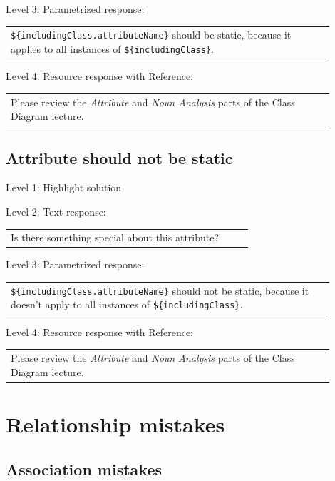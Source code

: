 \noindent Level 3: Parametrized response: \medskip

\begin{tabular}{|p{0.9\linewidth}}
\verb|${includingClass.attributeName}| should be static, because it applies to all instances of \verb|${includingClass}|.
\end{tabular} \medskip

\noindent Level 4: Resource response with Reference: \medskip

\begin{tabular}{|p{0.9\linewidth}}
Please review the \textit{Attribute} and \textit{Noun Analysis} parts of the Class Diagram lecture.
\end{tabular} \medskip


\subsection{Attribute should not be static}

\noindent Level 1: Highlight solution \medskip

\noindent Level 2: Text response: \medskip

\begin{tabular}{|p{0.9\linewidth}}
Is there something special about this attribute?
\end{tabular} \medskip

\noindent Level 3: Parametrized response: \medskip

\begin{tabular}{|p{0.9\linewidth}}
\verb|${includingClass.attributeName}| should not be static, because it doesn't apply to all instances of \verb|${includingClass}|.
\end{tabular} \medskip

\noindent Level 4: Resource response with Reference: \medskip

\begin{tabular}{|p{0.9\linewidth}}
Please review the \textit{Attribute} and \textit{Noun Analysis} parts of the Class Diagram lecture.
\end{tabular} \medskip



\section{Relationship mistakes}

\subsection{Association mistakes}

